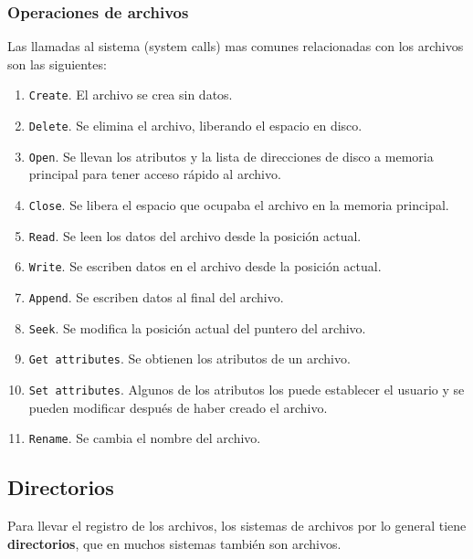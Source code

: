 \documentclass[12pt]{article}
\begin{document}
  \subsubsection{Operaciones de archivos}
  Las llamadas al sistema (system calls) mas comunes relacionadas con los archivos son las siguientes:
  \begin{enumerate}[1.]
    \item \verb|Create|. El archivo se crea sin datos.

    \item \verb|Delete|. Se elimina el archivo, liberando el espacio en disco.

    \item \verb|Open|. Se llevan los atributos y la lista de direcciones de disco a memoria principal para tener acceso rápido al archivo.

    \item \verb|Close|. Se libera el espacio que ocupaba el archivo en la memoria principal.

    \item \verb|Read|. Se leen los datos del archivo desde la posición actual.

    \item \verb|Write|. Se escriben datos en el archivo desde la posición actual.

    \item \verb|Append|. Se escriben datos al final del archivo.

    \item \verb|Seek|. Se modifica la posición actual del puntero del archivo.

    \item \verb|Get attributes|. Se obtienen los atributos de un archivo.

    \item \verb|Set attributes|. Algunos de los atributos los puede establecer el usuario y se pueden modificar después de haber creado el archivo.

    \item \verb|Rename|. Se cambia el nombre del archivo.
  \end{enumerate}

  \subsection{Directorios}
  Para llevar el registro de los archivos, los sistemas de archivos por lo general tiene \textbf{directorios}, que en muchos sistemas también son archivos.
\end{document}
